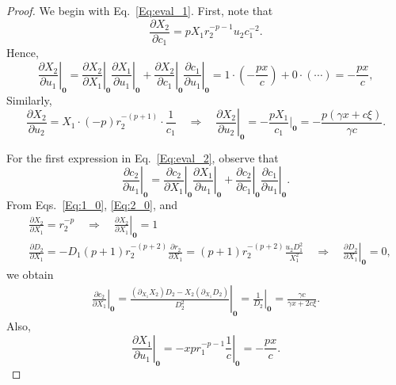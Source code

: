 \documentclass[10pt,a4paper]{amsart}
\begin{document}
\begin{proof}
	We begin with Eq.~\eqref{Eq:eval_1}.
	First, note that
	$$ \frac{\partial X_2}{\partial c_1} = p X_1 r_2^{-p-1} u_2 c_1^{-2}.$$
	Hence,
	\begin{equation}
	\left.\frac{\partial X_2}{\partial u_1}\right|_{\mathbf{0}}
	=
	\left.\frac{\partial X_2}{\partial X_1}\right|_{\mathbf{0}}\left.\frac{\partial X_1}{\partial u_1}\right|_{\mathbf{0}}
	+
	\left.\frac{\partial X_2}{\partial c_1}\right|_{\mathbf{0}}\left.\frac{\partial c_1}{\partial u_1}\right|_{\mathbf{0}}
	=
	1\cdot\left(-\frac{p x}{c}\right)+0\cdot(\cdots)
	=
	-\frac{p x}{c}, \label{Eq:X2_u1_0}
	\end{equation}
	Similarly,
	\begin{equation}
	\frac{\partial X_2}{\partial u_2} = 
	X_1\cdot(-p) r_2^{-(p+1)}\cdot\frac{1}{c_1}
	\quad\Rightarrow\quad
	\left.\frac{\partial X_2}{\partial u_2}\right|_{\mathbf{0}}
	= -\frac{p X_1}{c_1}\bigg|_{\mathbf{0}}
	= -\frac{p(\gamma x+c\xi)}{\gamma c}. \label{Eq:X2_u2_0}
	\end{equation}

	For the first expression in Eq.~\eqref{Eq:eval_2}, observe that
	\begin{equation}
	\left.\frac{\partial c_2}{\partial u_1}\right|_{\mathbf{\mathbf{0}}}
	= \left.\frac{\partial c_2}{\partial X_1}\right|_{\mathbf{0}}\left.\frac{\partial X_1}{\partial u_1}\right|_{\mathbf{0}} + 
	\left.\frac{\partial c_2}{\partial c_1}\right|_{\mathbf{0}}\left.\frac{\partial c_1}{\partial u_1}\right|_{\mathbf{0}}. \label{Eq:dc2_du1}
	\end{equation}
	From Eqs.~\eqref{Eq:1_0}, \eqref{Eq:2_0}, and
	\begin{align*}
	&\frac{\partial {X_2}}{\partial X_1} = r_2^{-p} \quad\Rightarrow\quad  \left. \frac{\partial {X_2}}{\partial X_1} \right|_{\mathbf{0}} = 1 \\ 
	& \frac{\partial{D_2}}{\partial X_1} =  - D_1 (p+1) r_2^{-(p+2)}\frac{\partial r_2}{\partial X_1} =  (p+1) r_2^{-(p+2)}\frac{u_2 D_1^2}{X_1^2} \quad\Rightarrow\quad  \left. \frac{\partial {D_2}}{\partial X_1} \right|_{\mathbf{0}} = 0,
	\end{align*}
	we obtain
	\begin{align}
		\left.\frac{\partial c_2}{\partial X_1}\right|_{\mathbf{0}} = \left. \frac{(\partial_{X_1}X_2) D_2 - X_2 (\partial_{X_1}D_2)}{D_2^2} \right|_{\mathbf{0}} = \left. \frac{1}{D_2} \right|_{\mathbf{0}} =  \frac{\gamma c}{\gamma x + 2c\xi }. \label{Eq:dc2_dX1}
	\end{align} 
	Also,
	\begin{equation}
	\left. \frac{\partial X_1}{\partial u_1} \right|_{\mathbf{{0}}} = \left. - x p r_{1}^{-p-1}\frac{1}{c} \right|_{\mathbf{{0}}}= -\frac{px}{c}. \label{Eq:dX_1_du_1_0}
	\end{equation}
	

\end{proof}
\end{document}
